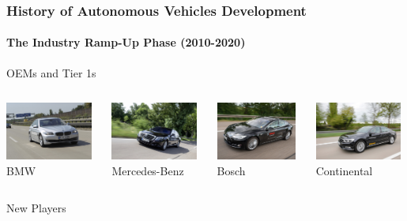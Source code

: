 \begin{frame}
\frametitle{History of Autonomous Vehicles Development}
\framesubtitle{The Industry Ramp-Up Phase (2010-2020)}
\centering OEMs and Tier 1s
\begin{columns}[T]
    \begin{column}{.25\textwidth}
        \centering
        \includegraphics[height=1.9cm]{images/bmw_had.jpg} \\
        \footnotesize BMW \cite{AeberhardBMWHAF2015}
    \end{column}
    \begin{column}{.25\textwidth}
        \centering
        \includegraphics[height=1.9cm]{images/mercedes_bertha_benz_drive.jpg} \\
        \footnotesize Mercedes-Benz \cite{DaimlerBertha2014}
    \end{column}
    \begin{column}{.25\textwidth}
        \centering
        \includegraphics[height=1.9cm]{images/bosch_had.jpg} \\
        \footnotesize Bosch \cite{BoschPressHAD}
    \end{column}
    \begin{column}{.25\textwidth}
        \centering
        \includegraphics[height=1.9cm]{images/continental_had.jpg} \\
        \footnotesize Continental \cite{ContinentalHAD}
    \end{column}
\end{columns}
\vspace{0.5cm}
\centering New Players

\end{frame}
